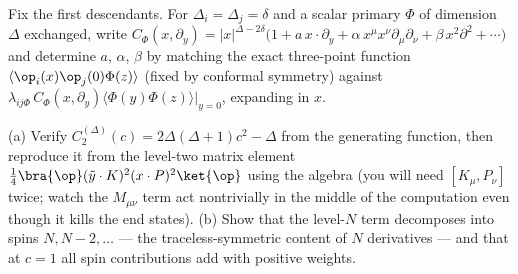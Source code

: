 \begin{exercise}[medium]
\label{exr:ope-descendants}
Fix the first descendants. For $\Delta_i = \Delta_j = \delta$ and a scalar
primary $\Phi$ of dimension $\Delta$ exchanged, write $C_\Phi(x, \partial_y) =
|x|^{\Delta - 2\delta}\big(1 + a\, x\cdot\partial_y + \alpha\, x^\mu x^\nu
\partial_\mu \partial_\nu + \beta\, x^2 \partial^2 + \cdots\big)$ and
determine $a$, $\alpha$, $\beta$ by matching the exact three-point function
$\langle\op_i(x)\op_j(0)\Phi(z)\rangle$ (fixed by conformal symmetry) against
$\lambda_{ij\Phi}\, C_\Phi(x,\partial_y)\langle \Phi(y)\Phi(z)\rangle|_{y=0}$,
expanding in $x$.
\end{exercise}

\begin{exercise}[classic]
\label{exr:gegenbauer}
(a) Verify $C^{(\Delta)}_2(c) = 2\Delta(\Delta+1)c^2 - \Delta$ from the
generating function, then reproduce it from the level-two matrix element
$\frac{1}{4}\bra{\op}(\tilde y \cdot K)^2 (x\cdot P)^2\ket{\op}$ using the
algebra (you will need $[K_\mu, P_\nu]$ twice; watch the $M_{\mu\nu}$ term
act nontrivially in the middle of the computation even though it kills the
end states). (b) Show that the level-$N$ term decomposes into spins $N, N-2,
\dots$ --- the traceless-symmetric content of $N$ derivatives --- and that at
$c=1$ all spin contributions add with positive weights.
\end{exercise}

